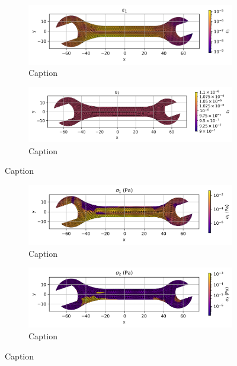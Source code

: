     \begin{figure}[H]
        \centering
        \begin{subfigure}[t]{0.49\textwidth}
        \centering
        \includegraphics[width=\textwidth]{GRAFICOS/Case d - epsilon_1_per_element.png}
        \caption{Caption}
        \label{fig:deformada_reacciones}
        \end{subfigure}
        \hfill
        \begin{subfigure}[t]{0.49\textwidth}
        \centering
        \includegraphics[width=\textwidth]{GRAFICOS/Case d - epsilon_2_per_element.png}
        \caption{Caption}
        \label{fig:von_mises}
        \end{subfigure}
        \caption{Caption}
        \label{fig:analisis_estructural}
    \end{figure}

    \begin{figure}[H]
        \centering
        \begin{subfigure}[t]{0.49\textwidth}
        \centering
        \includegraphics[width=\textwidth]{GRAFICOS/Case d - sigma_1_per_element.png}
        \caption{Caption}
        \label{fig:deformada_reacciones}
        \end{subfigure}
        \hfill
        \begin{subfigure}[t]{0.49\textwidth}
        \centering
        \includegraphics[width=\textwidth]{GRAFICOS/Case d - sigma_2_per_element.png}
        \caption{Caption}
        \label{fig:von_mises}
        \end{subfigure}
        \caption{Caption}
        \label{fig:analisis_estructural}
    \end{figure}
  